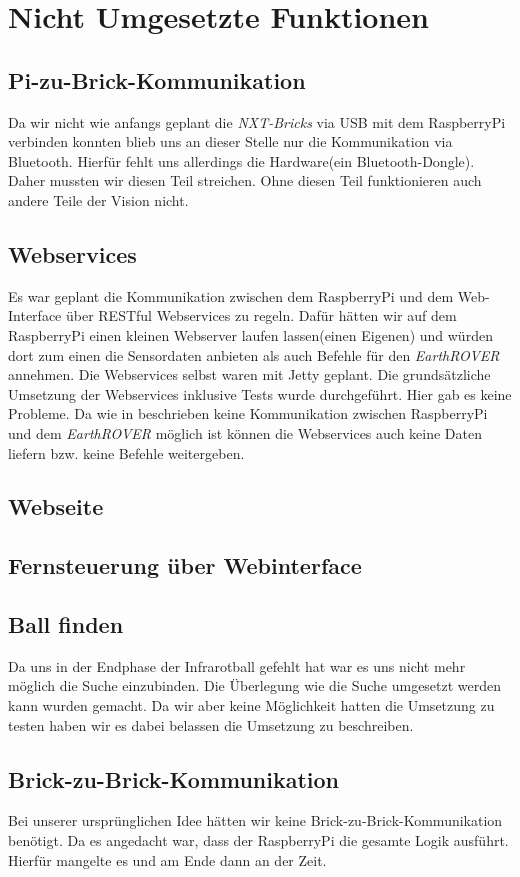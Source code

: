 \chapter{Nicht Umgesetzte Funktionen}
\section{Pi-zu-Brick-Kommunikation}
\label{lbl:ptbcomm}
Da wir nicht wie anfangs geplant die \textit{NXT-Bricks} via USB mit dem RaspberryPi verbinden konnten blieb uns an dieser Stelle nur die Kommunikation via Bluetooth. Hierfür fehlt uns allerdings die Hardware(ein Bluetooth-Dongle). Daher mussten wir diesen Teil streichen. Ohne diesen Teil funktionieren auch andere Teile der Vision nicht.

\section{Webservices}
Es war geplant die Kommunikation zwischen dem RaspberryPi und dem Web-Interface über RESTful Webservices zu regeln. Dafür hätten wir auf dem RaspberryPi einen kleinen Webserver laufen lassen(einen Eigenen) und würden dort zum einen die Sensordaten anbieten als auch Befehle für den \textit{EarthROVER} annehmen. Die Webservices selbst waren mit Jetty geplant. Die grundsätzliche Umsetzung der Webservices inklusive Tests wurde durchgeführt. Hier gab es keine Probleme. Da wie in  beschrieben keine Kommunikation zwischen RaspberryPi und dem \textit{EarthROVER} möglich ist können die Webservices auch keine Daten liefern bzw. keine Befehle weitergeben.

\section{Webseite}

\section{Fernsteuerung über Webinterface}

\section{Ball finden}
Da uns in der Endphase der Infrarotball gefehlt hat war es uns nicht mehr möglich die Suche einzubinden. Die Überlegung wie die Suche umgesetzt werden kann wurden gemacht. Da wir aber keine Möglichkeit hatten die Umsetzung zu testen haben wir es dabei belassen die Umsetzung zu beschreiben.

\section{Brick-zu-Brick-Kommunikation}
Bei unserer ursprünglichen Idee hätten wir keine Brick-zu-Brick-Kommunikation benötigt. Da es angedacht war, dass der RaspberryPi die gesamte Logik ausführt. Hierfür mangelte es und am Ende dann an der Zeit. 

